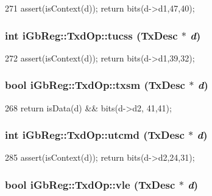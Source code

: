 \begin{DoxyCode}
271 { assert(isContext(d)); return bits(d->d1,47,40); }
\end{DoxyCode}
\hypertarget{namespaceiGbReg_1_1TxdOp_a409b5433c1fa1dbf05aded9da4d90622}{
\subsubsection[{tucss}]{\setlength{\rightskip}{0pt plus 5cm}int iGbReg::TxdOp::tucss (TxDesc $\ast$ {\em d})}}
\label{namespaceiGbReg_1_1TxdOp_a409b5433c1fa1dbf05aded9da4d90622}



\begin{DoxyCode}
272 { assert(isContext(d)); return bits(d->d1,39,32); }
\end{DoxyCode}
\hypertarget{namespaceiGbReg_1_1TxdOp_a0182840b987fe696a6728f84db149b74}{
\subsubsection[{txsm}]{\setlength{\rightskip}{0pt plus 5cm}bool iGbReg::TxdOp::txsm (TxDesc $\ast$ {\em d})}}
\label{namespaceiGbReg_1_1TxdOp_a0182840b987fe696a6728f84db149b74}



\begin{DoxyCode}
268 { return isData(d) && bits(d->d2, 41,41); }
\end{DoxyCode}
\hypertarget{namespaceiGbReg_1_1TxdOp_a9cfaa8cb088f6ce63b22853cd0e920bf}{
\subsubsection[{utcmd}]{\setlength{\rightskip}{0pt plus 5cm}int iGbReg::TxdOp::utcmd (TxDesc $\ast$ {\em d})}}
\label{namespaceiGbReg_1_1TxdOp_a9cfaa8cb088f6ce63b22853cd0e920bf}



\begin{DoxyCode}
285 { assert(isContext(d)); return bits(d->d2,24,31); }
\end{DoxyCode}
\hypertarget{namespaceiGbReg_1_1TxdOp_ad25431c134234e0709d6020ebc822a65}{
\subsubsection[{vle}]{\setlength{\rightskip}{0pt plus 5cm}bool iGbReg::TxdOp::vle (TxDesc $\ast$ {\em d})}}
\label{namespaceiGbReg_1_1TxdOp_ad25431c134234e0709d6020ebc822a65}



